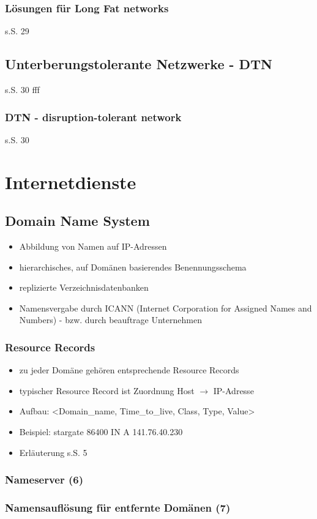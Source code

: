 \subsubsection{Lösungen für Long Fat networks}
s.S. 29
\subsection{Unterberungstolerante Netzwerke - DTN}
s.S. 30 fff
\subsubsection{DTN - disruption-tolerant network}
s.S. 30
\section{Internetdienste}
\subsection{Domain Name System}
\begin{itemize}
	\item Abbildung von Namen auf IP-Adressen
	\item hierarchisches, auf Domänen basierendes Benennungsschema
	\item replizierte Verzeichnisdatenbanken
	\item Namensvergabe durch ICANN (Internet Corporation for Assigned Names and Numbers) - bzw. durch beauftrage Unternehmen
\end{itemize}
\subsubsection{Resource Records}
\begin{itemize}
	\item zu jeder Domäne gehören entsprechende Resource Records
	\item typischer Resource Record ist Zuordnung Host $\to$ IP-Adresse
	\item Aufbau: <Domain\_name, Time\_to\_live, Class, Type, Value>
	\item Beispiel: stargate 86400 IN A 141.76.40.230
	\item Erläuterung s.S. 5
\end{itemize}
\subsubsection{Nameserver (6)}
\subsubsection{Namensauflösung für entfernte Domänen (7)}
